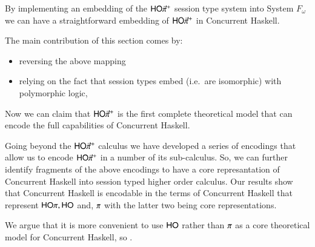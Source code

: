 By implementing an embedding of the $\mathsf{HO}{\vec{\pi}}^{+}$ session type system into 
System $F_\omega$ we can have a straightforward embedding of $\mathsf{HO}{\vec{\pi}}^{+}$
in Concurrent Haskell.


The main contribution of this section comes by:
\begin{itemize}
	\item	reversing the above mapping
	\item	relying on the fact that session types embed (i.e.~are isomorphic) with polymorphic logic, \cite{DBLP:conf/esop/CairesPPT13}
\end{itemize}

Now we can claim that $\mathsf{HO}{\vec{\pi}}^{+}$ is the first complete
theoretical model that can encode the full capabilities of Concurrent
Haskell.

Going beyond the $\mathsf{HO}{\vec{\pi}}^{+}$ calculus we have developed a series
of encodings that allow us to encode $\mathsf{HO}{\vec{\pi}}^{+}$ in a number
of its sub-calculus. So, we can further identify fragments of
the above encodings to have a core represantation of Concurrent
Haskell into session typed higher order calculus.
Our results show that Concurrent Haskell is encodable
in the terms of Concurrent Haskell that represent
$\mathsf{HO}\pi, \mathsf{HO}$ and, $\pi$ with the latter two being
core representations.

We argue that it is more convenient to use $\mathsf{HO}$ rather
than $\pi$ as a core theoretical model for Concurrent Haskell,
so .

